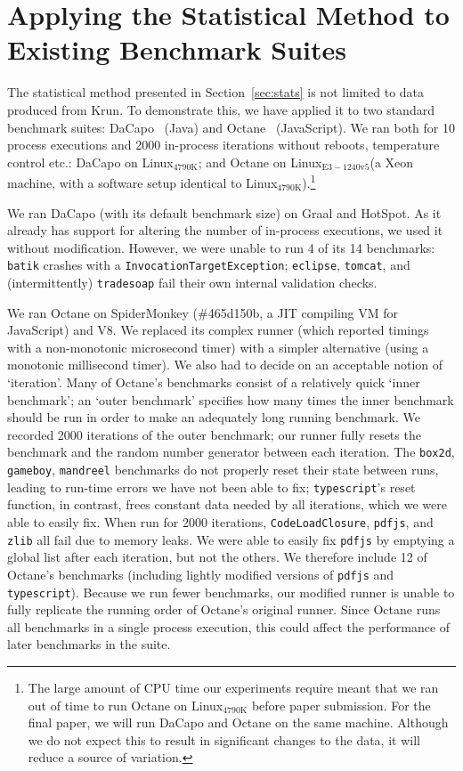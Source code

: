 \documentclass[preprint,numbers,10pt]{sigplanconf}
\newcommand{\bencherthree}{Linux$_\mathrm{4790K}$\xspace}
\newcommand{\bencherseven}{Linux$_\mathrm{E3-1240v5}$\xspace}
\begin{document}
\section{Applying the Statistical Method to Existing Benchmark Suites}
\label{sec:existing}

The statistical method presented in Section~\ref{sec:stats} is not limited to data
produced from Krun. To demonstrate this, we have applied it to two standard
benchmark suites: DaCapo~\cite{dacapo06} (Java) and Octane~\cite{octane}
(JavaScript). We ran both for 10 process executions and 2000 in-process
iterations without reboots, temperature control etc.: DaCapo on \bencherthree;
and Octane on \bencherseven (a Xeon machine, with a software setup
identical to \bencherthree).\footnote{The large amount of CPU time our
experiments require meant that we ran out of time to run Octane on \bencherthree
before paper submission. For the final paper, we will run DaCapo and Octane on
the same machine. Although we do not expect this to result in significant
changes to the data, it will reduce a source of variation.}

We ran DaCapo (with its default benchmark size) on Graal and HotSpot. As it already has support for
altering the number of in-process executions, we used it without modification.
However, we were unable to run 4 of its 14 benchmarks: \texttt{batik}
crashes with a \texttt{Invocation\-Target\-Exception}; \texttt{eclipse},
\texttt{tomcat}, and (intermittently) \texttt{tradesoap} fail their own internal
validation checks.

We ran Octane on SpiderMonkey (\#465d150b, a JIT compiling VM for JavaScript) and V8.
We replaced its complex runner (which reported timings with a non-monotonic
microsecond timer) with a simpler alternative (using a monotonic millisecond
timer). We also had to decide on an acceptable notion of `iteration'. Many of Octane's
benchmarks consist of a relatively quick `inner benchmark'; an `outer benchmark'
specifies how many times the inner benchmark should be run in order to make an
adequately long running benchmark. We recorded 2000 iterations of the outer benchmark; our runner
fully resets the benchmark and the random number generator between each
iteration. The \texttt{box2d}, \texttt{gameboy}, \texttt{mandreel} benchmarks do
not properly reset their state between runs, leading to run-time errors we have
not been able to fix; \texttt{typescript}'s reset function, in contrast,
frees constant data needed by all iterations, which we were able
to easily fix. When run for 2000 iterations, \texttt{CodeLoadClosure},
\texttt{pdfjs}, and \texttt{zlib} all fail due to memory leaks. We were able to
easily fix \texttt{pdfjs} by emptying a global list after each iteration, but not the
others. We therefore include 12 of Octane's benchmarks (including lightly
modified versions of \texttt{pdfjs} and \texttt{typescript}).
Because we run fewer benchmarks, our modified runner is unable to fully
replicate the running order of Octane's original runner. Since Octane runs all
benchmarks in a single process execution, this could affect the performance of
later benchmarks in the suite.
\end{document}
